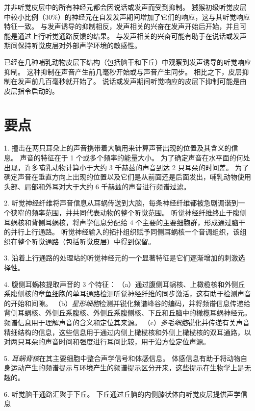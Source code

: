 并非听觉皮层中的所有神经元都会因说话或发声而受到抑制。
狨猴初级听觉皮层中较小比例（30\%）的神经元在自发发声期间增加了它们的响应，这与其听觉响应特征一致。
与发声诱导的抑制相反，发声相关的兴奋在发声开始后开始，并且可能是通过上行听觉通路反馈的结果。
与发声相关的兴奋可能有助于在说话或发声期间保持听觉皮层对外部声学环境的敏感性。


已经在几种哺乳动物皮层下结构（包括脑干和下丘）中观察到发声诱导的听觉响应抑制。
这种抑制在声音产生前几毫秒开始或与声音产生同步。
相比之下，皮层抑制在发声前几百毫秒就开始了。
说话或发声期间听觉响应的皮层下抑制可能是由皮层指令启动的。



\section{要点}

1. 撞击在两只耳朵上的声音携带着大脑用来计算声音出现的位置及其含义的信息。
声音的特征在于 1 个或多个频率的能量大小。
为了确定声音在水平面的何处出现，许多哺乳动物计算小于大约 3 千赫兹的声音到达 2 只耳朵的时间差。
为了确定声音在垂直方向上出现的位置以及它们是从前面还是后面发出，哺乳动物使用头部、肩部和外耳对大于大约 6 千赫兹的声音进行频谱过滤。 


2. 听觉神经纤维将声音信息从耳蜗传送到大脑，每条神经纤维都被急剧调谐到一个狭窄的频率范围，并共同代表动物的整个听觉范围。
听觉神经纤维终止于腹侧耳蜗核和背侧耳蜗核，将声学信息分配给 4 个主要的主要细胞群，形成通过脑干的并行上行通路。
听觉神经输入的拓扑组织赋予同侧耳蜗核一个音调组织，该组织在整个听觉通路（包括听觉皮层）中得到保留。


3. 沿着上行通路的处理站的听觉神经元的一个显著特征是它们逐渐增加的刺激选择性。


4. 腹侧耳蜗核提取声音的 3 个特征：
（a）通过腹侧耳蜗核、上橄榄核和外侧丘系腹侧核的章鱼细胞的单耳通路检测听觉神经纤维的同步激活，这有助于检测声音的开始和间隙。
（b）\textit{星形细胞}检测并锐化频谱峰谷的编码，并将频谱信息传递给背侧耳蜗核、外侧丘系腹核、外侧丘系腹侧核、下丘和丘脑中的橄榄耳蜗神经元。 
频谱信息用于理解声音的含义和定位其来源。 
（c）\textit{多毛细胞}锐化并传递有关声音精细结构的信息，这些信息用于通过内侧上橄榄核和外侧上橄榄核的双耳通路，以对两只耳朵的声音时间和强度进行耳间比较，用于沿方位定位声源。


5. \textit{耳蜗背核}在其主要细胞中整合声学信号和体感信息。
体感信息有助于将动物自身运动产生的频谱提示与环境产生的频谱提示区分开来，这些提示在生物学上是无趣的。


6. 听觉脑干通路汇聚于下丘。
下丘通过丘脑的内侧膝状体向听觉皮层提供声学信息

